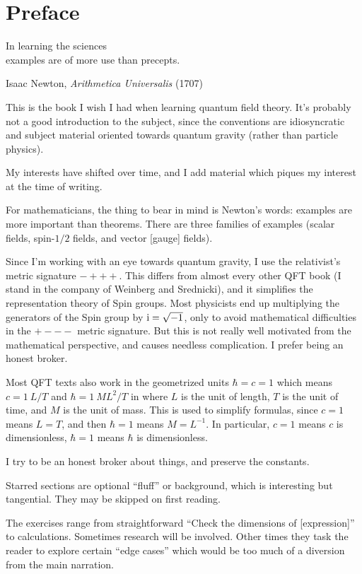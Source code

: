 \chapter*{Preface}

\epigraph{In learning the sciences\\
  examples are of more use than precepts.}%
{Isaac Newton, \textit{Arithmetica Universalis} (1707)}

\M
This is the book I wish I had when learning quantum field theory.
It's probably not a good introduction to the subject, since the
conventions are idiosyncratic and subject material oriented towards
quantum gravity (rather than particle physics).

My interests have shifted over time, and I add material which piques my
interest at the time of writing.

\M
For mathematicians, the thing to bear in mind is Newton's words:
examples are more important than theorems. There are three families of
examples (scalar fields, spin-$1/2$ fields, and vector [gauge] fields).

Since I'm working with an eye towards quantum gravity, I use the
relativist's metric signature $-+++$. This differs from almost every
other QFT book (I stand in the company of Weinberg and Srednicki), and
it simplifies the representation theory of Spin groups. Most physicists
end up multiplying the generators of the Spin group by $\mathrm{i}=\sqrt{-1}$,
only to avoid mathematical difficulties in the $+---$ metric
signature. But this is not really well motivated from the mathematical
perspective, and causes needless complication. I prefer being an honest
broker.

Most QFT texts also work in the geometrized units $\hbar=c=1$ which
means $c=1~L/T$ and $\hbar=1~ML^{2}/T$ in where $L$ is the unit of
length, $T$ is the unit of time, and $M$ is the unit of mass. This is
used to simplify formulas, since $c=1$ means $L=T$, and then $\hbar=1$
means $M=L^{-1}$. In particular, $c=1$ means $c$ is dimensionless,
$\hbar=1$ means $\hbar$ is dimensionless.

I try to be an honest broker about things, and preserve the constants.

Starred sections are optional ``fluff'' or background, which is
interesting but tangential. They may be skipped on first reading.

The exercises range from straightforward ``Check the dimensions of
[expression]'' to calculations. Sometimes research will be involved.
Other times they task the reader to explore certain ``edge cases''
which would be too much of a diversion from the main narration.

